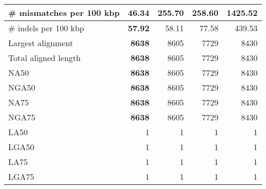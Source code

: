 \documentclass[12pt,a4paper]{article}
\begin{document}
\begin{table}[ht]
\begin{center}
\begin{tabular}{|l*{4}{|r}|}
\# mismatches per 100 kbp & {\bf 46.34} & 255.70 & 258.60 & 1425.52 \\ \hline
\# indels per 100 kbp & {\bf 57.92} & 58.11 & 77.58 & 439.53 \\ \hline
Largest alignment & {\bf 8638} & 8605 & 7729 & 8430 \\ \hline
Total aligned length & {\bf 8638} & 8605 & 7729 & 8430 \\ \hline
NA50 & {\bf 8638} & 8605 & 7729 & 8430 \\ \hline
NGA50 & {\bf 8638} & 8605 & 7729 & 8430 \\ \hline
NA75 & {\bf 8638} & 8605 & 7729 & 8430 \\ \hline
NGA75 & {\bf 8638} & 8605 & 7729 & 8430 \\ \hline
LA50 & 1 & 1 & 1 & 1 \\ \hline
LGA50 & 1 & 1 & 1 & 1 \\ \hline
LA75 & 1 & 1 & 1 & 1 \\ \hline
LGA75 & 1 & 1 & 1 & 1 \\ \hline
\end{tabular}
\end{center}
\end{table}
\end{document}
